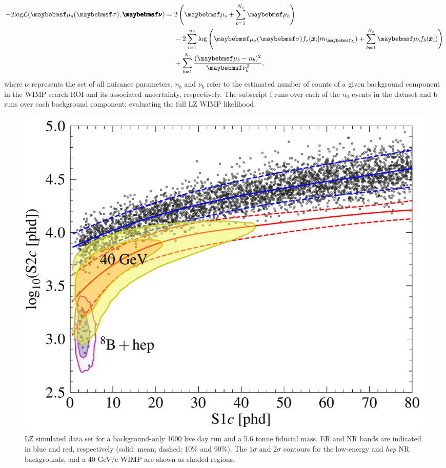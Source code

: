 %
\begin{equation}
    \begin{split}
    - 2\MathText{log}\mathcal{L}(\mu_{s}(\sigma), \pmb{\nu}) = \; &2\left(\mu_{s} + \sum_{b=1}^{N_{c}}\mu_{b} \right) \\
    &- 2\sum_{i=1}^{n_{0}} \MathText{log} \left( \mu_{s}(\sigma)f_s(\pmb{x}_{i}|m_{\chi})
    + \sum_{b=1}^{N_{c}} \mu_{b}f_{b}(\pmb{x}_{i}) \right) \\
    &+ \sum_{b=1}^{N_{c}} \frac{(\mu_{b}-n_{b})^{2}}{\nu_{b}^{2}},
    \end{split}
    \label{eq:full_lz_likelihood}
\end{equation}
%
where $\pmb{\nu}$ represents the set of all nuisance parameters, $n_{b}$ and $\nu_{b}$ refer to the estimated number of counts of a given background component in the WIMP search ROI and its associated uncertainty, respectively. The subscript i runs over each of the $n_{0}$ events in the dataset and b runs over each background component; evaluating the full LZ WIMP likelihood.  

\begin{figure}[h!]
    \centering
    \includegraphics[scale=0.6]{Chapter_5/Figures/sensitivity_studies/background_with_40_gev_wimp.pdf}
    \caption[LZ simulated data set for a background-only 1000 live day run and a 5.6 tonne fiducial mass. ER and NR bands are indicated in blue and red, respectively (solid: mean; dashed: 10\% and 90\%). The $1\sigma$ and $2\sigma$ contours for the low-energy \BE{} and \textit{hep} NR backgrounds, and a 40 GeV/c\squared{} WIMP are shown as shaded regions.]%
    {LZ simulated data set for a background-only 1000 live day run and a 5.6 tonne fiducial mass. ER and NR bands are indicated in blue and red, respectively (solid: mean; dashed: 10\% and 90\%). The $1\sigma$ and $2\sigma$ contours for the low-energy \BE{} and \textit{hep} NR backgrounds, and a 40 GeV/c\squared{} WIMP are shown as shaded regions.}
    \label{fig:lz_1000_day_run}
\end{figure}
%

